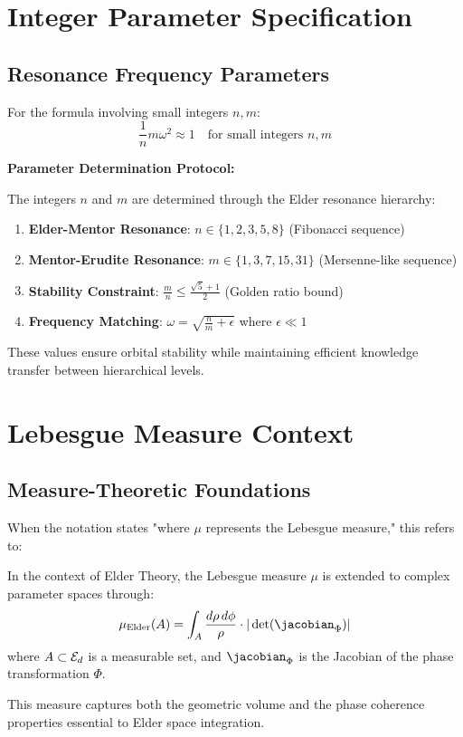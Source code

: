 \section{Integer Parameter Specification}

\subsection{Resonance Frequency Parameters}

For the formula involving small integers $n, m$:
\begin{equation}
\frac{1}{n}m\omega^2 \approx 1 \quad \text{for small integers } n,m
\end{equation}

\textbf{Parameter Determination Protocol:}

The integers $n$ and $m$ are determined through the Elder resonance hierarchy:

\begin{enumerate}
    \item \textbf{Elder-Mentor Resonance}: $n \in \{1, 2, 3, 5, 8\}$ (Fibonacci sequence)
    \item \textbf{Mentor-Erudite Resonance}: $m \in \{1, 3, 7, 15, 31\}$ (Mersenne-like sequence)
    \item \textbf{Stability Constraint}: $\frac{m}{n} \leq \frac{\sqrt{5}+1}{2}$ (Golden ratio bound)
    \item \textbf{Frequency Matching}: $\omega = \sqrt{\frac{n}{m} + \epsilon}$ where $\epsilon \ll 1$
\end{enumerate}

These values ensure orbital stability while maintaining efficient knowledge transfer between hierarchical levels.

\section{Lebesgue Measure Context}

\subsection{Measure-Theoretic Foundations}

When the notation states "where $\mu$ represents the Lebesgue measure," this refers to:

\begin{definition}
In the context of Elder Theory, the Lebesgue measure $\mu$ is extended to complex parameter spaces through:
\begin{equation}
\mu_{\text{Elder}}(A) = \int_A \frac{d\rho \, d\phi}{\rho} \cdot |\det(\jacobian_{\Phi})|
\end{equation}
where $A \subset \mathcal{E}_{d}$ is a measurable set, and $\jacobian_{\Phi}$ is the Jacobian of the phase transformation $\Phi$.
\end{definition}

This measure captures both the geometric volume and the phase coherence properties essential to Elder space integration.